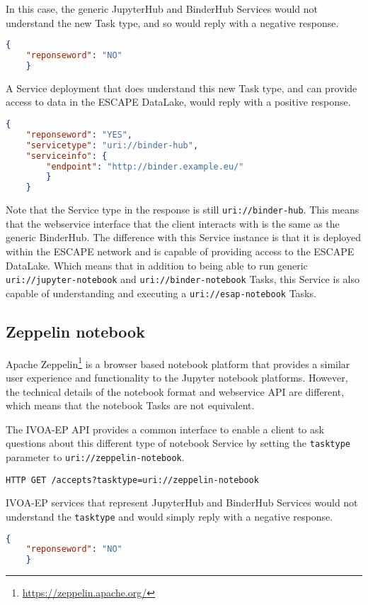 \documentclass[11pt,a4paper]{ivoa}
\newcommand{\webservice} {webservice\xspace}
\newcommand{\ivoep} {IVOA-EP\xspace}
\newcommand{\binderhub} {BinderHub\xspace}
\newcommand{\jupyter} {Jupyter\xspace}
\newcommand{\jupyterhub} {JupyterHub\xspace}
\newcommand{\escape} {ESCAPE\xspace}
\newcommand{\datalake} {DataLake\xspace}
\newcommand{\apache} {Apache\xspace}
\newcommand{\zeppelin} {Zeppelin\xspace}
\newcommand{\codeword}[1] {\texttt{#1}}
\newcommand{\footurl}[1] {\footnote{\url{#1}}}
\begin{document}
In this case, the generic \jupyterhub and \binderhub Services would not understand the new Task type, and so would reply with a negative response.
\begin{lstlisting}[language=json]
    {
    "reponseword": "NO"
    }
\end{lstlisting}
A Service deployment that does understand this new Task type, and can provide access to data in the \escape \datalake, would reply with a positive response.
\begin{lstlisting}[language=json]
    {
    "reponseword": "YES",
    "servicetype": "uri://binder-hub",
    "serviceinfo": {
        "endpoint": "http://binder.example.eu/"
        }
    }
\end{lstlisting}
Note that the Service type in the response is still \codeword{uri://binder-hub}. This means that the \webservice interface that the client interacts with is the same as the generic \binderhub.
The difference with this Service instance is that it is deployed within the \escape network and is capable of providing access to the \escape \datalake.
Which means that in addition to being able to run generic \codeword{uri://jupyter-notebook} and \codeword{uri://binder-notebook} Tasks, this Service is also capable of understanding and executing a \codeword{uri://esap-notebook} Tasks.

\subsection{Zeppelin notebook}
\label{sec:uri://zeppelin-notebook}
\apache \zeppelin \footurl{https://zeppelin.apache.org/} is a browser based notebook platform that provides a similar user experience and functionality to the \jupyter notebook platforms.
However, the technical details of the notebook format and \webservice API are different, which means that the notebook Tasks are not equivalent.

The \ivoep API provides a common interface to enable a client to ask questions about this different type of notebook Service by setting the \codeword{tasktype} parameter to \codeword{uri://zeppelin-notebook}.

\begin{lstlisting}[]
    HTTP GET /accepts?tasktype=uri://zeppelin-notebook
\end{lstlisting}

\ivoep services that represent \jupyterhub and \binderhub Services would not understand the \codeword{tasktype} and would simply reply with a negative response.
\begin{lstlisting}[language=json]
    {
    "reponseword": "NO"
    }
\end{lstlisting}
\end{document}
